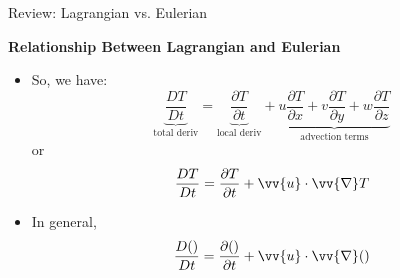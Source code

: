\begin{frame}{Review: Lagrangian vs. Eulerian}

\textbf{Relationship Between Lagrangian and Eulerian}
\begin{itemize}
	\item So, we have:
	$$\underbrace{\frac{DT}{Dt}}_{\text{total deriv}} = \underbrace{\frac{\partial T}{\partial t}}_{\text{local deriv}} + \underbrace{u\frac{\partial T}{\partial x} + v\frac{\partial T}{\partial y} + w\frac{\partial T}{\partial z}}_{\text{advection terms}}$$
	or
	$$\frac{DT}{Dt} = \frac{\partial T}{\partial t} + \vv{u} \cdot \vv{\nabla} T$$
	\item In general,
	$$\frac{D()}{Dt} = \frac{\partial ()}{\partial t} + \vv{u} \cdot \vv{\nabla} ()$$
\end{itemize}
\end{frame}


